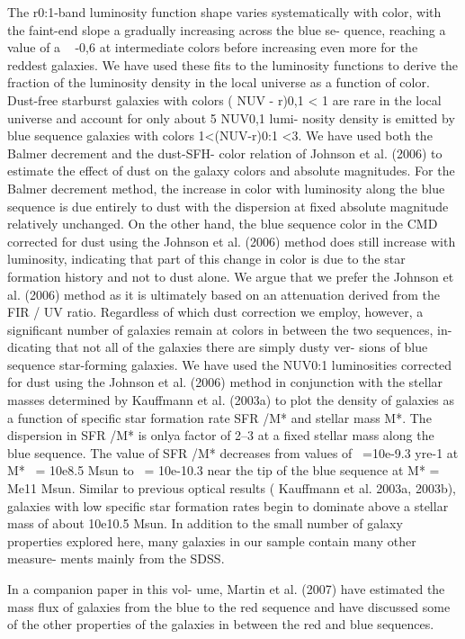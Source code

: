 The r0:1-band luminosity
function shape varies systematically with color, with the faint-end slope a
gradually increasing across the blue se- quence, reaching a value of a ~ -0,6
at intermediate colors before increasing even more for the reddest galaxies. We
have used these fits to the luminosity functions to derive the fraction of the
luminosity density in the local universe as a function of color. Dust-free
starburst galaxies with colors ( NUV - r)0,1 < 1 are rare in the local universe
and account for only about 5%
NUV0,1 lumi- nosity density is emitted by blue sequence galaxies with colors
1<(NUV-r)0:1 <3. We have used both the Balmer decrement and the dust-SFH- color
relation of Johnson et al. (2006) to estimate the effect of dust on the galaxy
colors and absolute magnitudes. For the Balmer decrement method, the increase in
color with luminosity along the blue sequence is due entirely to dust with the
dispersion at fixed absolute magnitude relatively unchanged. On the other hand,
the blue sequence color in the CMD corrected for dust using the Johnson et al.
(2006) method does still increase with luminosity, indicating that part of this
change in color is due to the star formation history and not to dust alone. We
argue that we prefer the Johnson et al. (2006) method as it is ultimately based
on an attenuation derived from the FIR / UV ratio. Regardless of which dust
correction we employ, however, a significant number of galaxies remain at colors
in between the two sequences, in- dicating that not all of the galaxies there
are simply dusty ver- sions of blue sequence star-forming galaxies. We have used
the NUV0:1 luminosities corrected for dust using the Johnson et al. (2006)
method in conjunction with the stellar masses determined by Kauffmann et al.
(2003a) to plot the density of galaxies as a function of specific star formation
rate SFR /M* and stellar mass M*. The dispersion in SFR /M* is onlya
factor of 2–3 at a fixed stellar mass along the blue sequence. The value of SFR
/M* decreases from values of ~=10e-9.3 yre-1 at M* ~= 10e8.5 Msun to
~= 10e-10.3 near the tip of the blue sequence at M* = Me11 Msun.
Similar to previous optical results ( Kauffmann et al. 2003a, 2003b), galaxies with low
specific star formation rates begin to dominate above a stellar mass of about
10e10.5 Msun. In addition to the small number of galaxy properties explored
here, many galaxies in our sample contain many other measure- ments mainly from the
SDSS.

In a companion paper in this vol- ume, Martin et al. (2007) have estimated
the mass flux of galaxies from the blue to the red sequence and have discussed
some of the other properties of the galaxies in between the red and blue
sequences.


